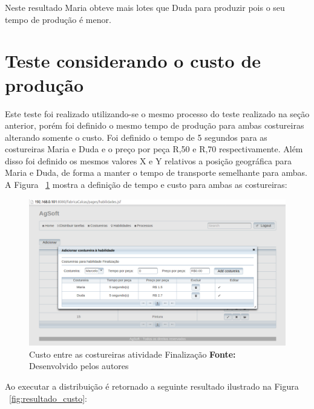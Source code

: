 \par Neste resultado Maria obteve mais lotes que Duda para produzir pois o seu tempo de produção é menor.

\section{Teste considerando o custo de produção}

\par Este teste foi realizado utilizando-se o mesmo processo do teste realizado na seção anterior,
porém foi definido o mesmo tempo de produção para ambas costureiras alterando somente o custo. Foi definido 
o tempo de 5 segundos para as costureiras Maria e Duda e o preço por peça R,50 e R,70 respectivamente. Além disso foi definido os mesmos valores X e Y relativos a posição geográfica para 
Maria e Duda, de forma a manter o tempo de transporte semelhante para ambas. 
A Figura ~\ref{fig:custo_entre_costureiras} mostra a definição de tempo e custo para ambas as costureiras:



\begin{figure}[h!]
	\centerline{\includegraphics[scale=0.4]{./imagens/custo_entre_costureiras_teste2.png}}
	\caption[Custo entre as costureiras atividade Finalização]
	{Custo entre as costureiras atividade Finalização \textbf{Fonte:} Desenvolvido pelos autores}
	\label{fig:custo_entre_costureiras}
\end{figure}

\par Ao executar a distribuição é retornado a seguinte resultado ilustrado na Figura ~\ref{fig:resultado_custo}:

\newpage


